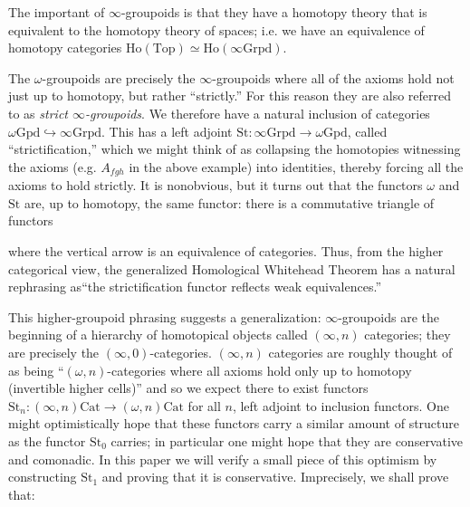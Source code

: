 \documentclass[12pt]{article}
\theoremstyle{definition}
\newcommand{\stinfty}{\omega\text{Gpd}}
\newcommand{\Ho}{\text{Ho}}
\newcommand{\st}{\text{St}}
\begin{document}
	The important of $\infty$-groupoids is that they have a homotopy theory that is equivalent to the homotopy theory of spaces; i.e. we have an equivalence of homotopy categories $\Ho(\text{Top}) \simeq \Ho(\infty\text{Grpd})$. 
	\par The $\omega$-groupoids are precisely the $\infty$-groupoids where all of the axioms hold not just up to homotopy, but rather ``strictly.'' 
	For this reason they are also referred to as \textit{strict $\infty$-groupoids}. 
	We therefore have a natural inclusion of categories $\stinfty \hookrightarrow \infty\text{Grpd}$. 
	This has a left adjoint $\st: \infty\text{Grpd} \to \stinfty$, called ``strictification,'' which we might think of as collapsing the homotopies witnessing the axioms (e.g. $A_{fgh}$ in the above example) into identities, thereby forcing all the axioms to hold strictly. 
	It is nonobvious, but it turns out that the functors $\omega$ and $\st$ are, up to homotopy, the same functor:
	there is a commutative triangle of functors
	\begin{center}
	\end{center}
	where the vertical arrow is an equivalence of categories. 
	Thus, from the higher categorical view, the generalized Homological Whitehead Theorem has a natural rephrasing as``the strictification functor reflects weak equivalences.''
	\par
	This higher-groupoid phrasing suggests a generalization: $\infty$-groupoids are the beginning of a hierarchy of homotopical objects called $(\infty,n)$ categories; they are precisely the $(\infty, 0)$-categories. $(\infty,n)$ categories are roughly thought of as being ``$(\omega,n)$-categories where all axioms hold only up to homotopy (invertible higher cells)'' and so we expect there to exist functors $\text{St}_n : (\infty,n)\text{Cat} \to (\omega,n)\text{Cat}$ for all $n$, left adjoint to inclusion functors. One might optimistically hope that these functors carry a similar amount of structure as the functor $\text{St}_0$ carries; in particular one might hope that they are conservative and comonadic. In this paper we will verify a small piece of this optimism by constructing $\text{St}_1$ and proving that it is conservative. Imprecisely, we shall prove that:
\end{document}
